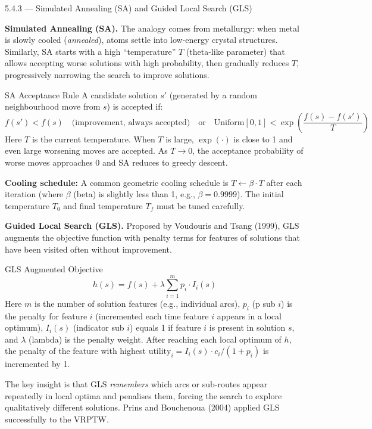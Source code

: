 \documentclass[aspectratio=169,10pt]{beamer}
\begin{document}
\begin{frame}[allowframebreaks]{5.4.3 --- Simulated Annealing (SA) and Guided Local Search (GLS)}

\textbf{Simulated Annealing (SA).}  The analogy comes from metallurgy: when metal
is slowly cooled (\emph{annealed}), atoms settle into low-energy crystal structures.
Similarly, SA starts with a high ``temperature'' $T$ (theta-like parameter) that
allows accepting worse solutions with high probability, then gradually reduces $T$,
progressively narrowing the search to improve solutions.

\begin{block}{SA Acceptance Rule}
A candidate solution $s'$ (generated by a random neighbourhood move from $s$) is
accepted if:
\[
  f(s') < f(s) \quad \text{(improvement, always accepted)}
  \quad\text{or}\quad
  \text{Uniform}[0,1] < \exp\!\left(\frac{f(s) - f(s')}{T}\right)
\]
Here $T$ is the current temperature.  When $T$ is large, $\exp(\cdot)$ is close to
1 and even large worsening moves are accepted.  As $T \to 0$, the acceptance
probability of worse moves approaches 0 and SA reduces to greedy descent.
\end{block}

\textbf{Cooling schedule:} A common geometric cooling schedule is $T \leftarrow
\beta \cdot T$ after each iteration (where $\beta$ (beta) is slightly less than 1,
e.g., $\beta = 0.9999$).  The initial temperature $T_0$ and final temperature $T_f$
must be tuned carefully.

\framebreak

\textbf{Guided Local Search (GLS).}  Proposed by Voudouris and Tsang (1999), GLS
augments the objective function with penalty terms for features of solutions that
have been visited often without improvement.

\begin{block}{GLS Augmented Objective}
\[
  h(s) = f(s) + \lambda \sum_{i=1}^{m} p_i \cdot I_i(s)
\]
Here $m$ is the number of solution features (e.g., individual arcs), $p_i$ (p sub
$i$) is the penalty for feature $i$ (incremented each time feature $i$ appears in
a local optimum), $I_i(s)$ (indicator sub $i$) equals 1 if feature $i$ is present
in solution $s$, and $\lambda$ (lambda) is the penalty weight.  After reaching each
local optimum of $h$, the penalty of the feature with highest
$\text{utility}_i = I_i(s) \cdot c_i / (1 + p_i)$ is incremented by 1.

\medskip
The key insight is that GLS \emph{remembers} which arcs or sub-routes appear
repeatedly in local optima and penalises them, forcing the search to explore
qualitatively different solutions.  Prins and Bouchenoua (2004) applied GLS
successfully to the VRPTW.
\end{block}

\end{frame}
\end{document}
